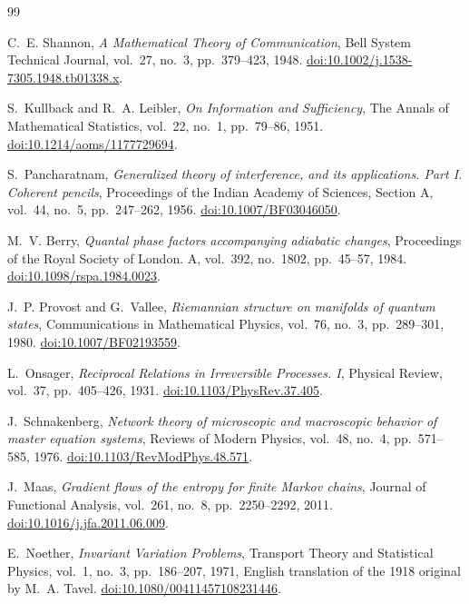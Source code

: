 \renewcommand{\bibname}{References}
\begin{thebibliography}{99}

C.~E. Shannon,
\emph{A Mathematical Theory of Communication},
Bell System Technical Journal, vol.~27, no.~3, pp.~379--423, 1948.
\href{https://doi.org/10.1002/j.1538-7305.1948.tb01338.x}{doi:10.1002/j.1538-7305.1948.tb01338.x}.

S.~Kullback and R.~A. Leibler,
\emph{On Information and Sufficiency},
The Annals of Mathematical Statistics, vol.~22, no.~1, pp.~79--86, 1951.
\href{https://doi.org/10.1214/aoms/1177729694}{doi:10.1214/aoms/1177729694}.

S.~Pancharatnam,
\emph{Generalized theory of interference, and its applications. Part I. Coherent pencils},
Proceedings of the Indian Academy of Sciences, Section A, vol.~44, no.~5, pp.~247--262, 1956.
\href{https://doi.org/10.1007/BF03046050}{doi:10.1007/BF03046050}.

M.~V. Berry,
\emph{Quantal phase factors accompanying adiabatic changes},
Proceedings of the Royal Society of London. A, vol.~392, no.~1802, pp.~45--57, 1984.
\href{https://doi.org/10.1098/rspa.1984.0023}{doi:10.1098/rspa.1984.0023}.

J.~P. Provost and G.~Vallee,
\emph{Riemannian structure on manifolds of quantum states},
Communications in Mathematical Physics, vol.~76, no.~3, pp.~289--301, 1980.
\href{https://doi.org/10.1007/BF02193559}{doi:10.1007/BF02193559}.

L.~Onsager,
\emph{Reciprocal Relations in Irreversible Processes. I},
Physical Review, vol.~37, pp.~405--426, 1931.
\href{https://doi.org/10.1103/PhysRev.37.405}{doi:10.1103/PhysRev.37.405}.

J.~Schnakenberg,
\emph{Network theory of microscopic and macroscopic behavior of master equation systems},
Reviews of Modern Physics, vol.~48, no.~4, pp.~571--585, 1976.
\href{https://doi.org/10.1103/RevModPhys.48.571}{doi:10.1103/RevModPhys.48.571}.

J.~Maas,
\emph{Gradient flows of the entropy for finite Markov chains},
Journal of Functional Analysis, vol.~261, no.~8, pp.~2250--2292, 2011.
\href{https://doi.org/10.1016/j.jfa.2011.06.009}{doi:10.1016/j.jfa.2011.06.009}.

E.~Noether,
\emph{Invariant Variation Problems},
Transport Theory and Statistical Physics, vol.~1, no.~3, pp.~186--207, 1971,
English translation of the 1918 original by M.~A. Tavel.
\href{https://doi.org/10.1080/00411457108231446}{doi:10.1080/00411457108231446}.


\end{thebibliography}
